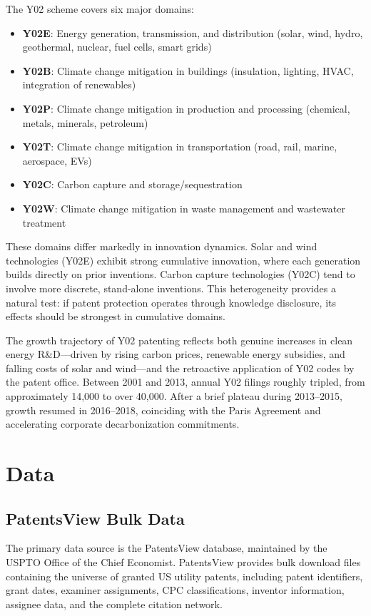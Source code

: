 \documentclass[12pt]{article}
\begin{document}
The Y02 scheme covers six major domains:
\begin{itemize}
\item \textbf{Y02E}: Energy generation, transmission, and distribution (solar, wind, hydro, geothermal, nuclear, fuel cells, smart grids)
\item \textbf{Y02B}: Climate change mitigation in buildings (insulation, lighting, HVAC, integration of renewables)
\item \textbf{Y02P}: Climate change mitigation in production and processing (chemical, metals, minerals, petroleum)
\item \textbf{Y02T}: Climate change mitigation in transportation (road, rail, marine, aerospace, EVs)
\item \textbf{Y02C}: Carbon capture and storage/sequestration
\item \textbf{Y02W}: Climate change mitigation in waste management and wastewater treatment
\end{itemize}

These domains differ markedly in innovation dynamics. Solar and wind technologies (Y02E) exhibit strong cumulative innovation, where each generation builds directly on prior inventions. Carbon capture technologies (Y02C) tend to involve more discrete, stand-alone inventions. This heterogeneity provides a natural test: if patent protection operates through knowledge disclosure, its effects should be strongest in cumulative domains.

The growth trajectory of Y02 patenting reflects both genuine increases in clean energy R\&D---driven by rising carbon prices, renewable energy subsidies, and falling costs of solar and wind---and the retroactive application of Y02 codes by the patent office. Between 2001 and 2013, annual Y02 filings roughly tripled, from approximately 14,000 to over 40,000. After a brief plateau during 2013--2015, growth resumed in 2016--2018, coinciding with the Paris Agreement and accelerating corporate decarbonization commitments.


\section{Data}

\subsection{PatentsView Bulk Data}

The primary data source is the PatentsView database, maintained by the USPTO Office of the Chief Economist. PatentsView provides bulk download files containing the universe of granted US utility patents, including patent identifiers, grant dates, examiner assignments, CPC classifications, inventor information, assignee data, and the complete citation network.
\end{document}
